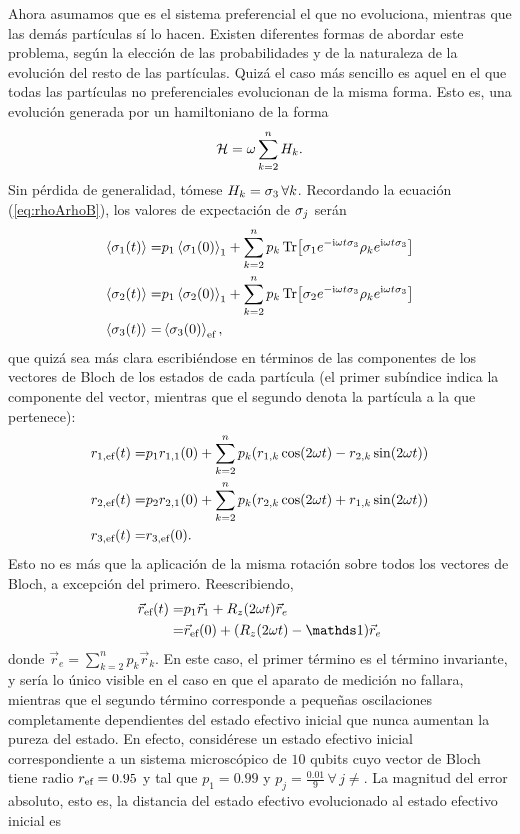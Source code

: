 Ahora asumamos que es el sistema preferencial el que no evoluciona, mientras que las demás partículas sí lo hacen. Existen diferentes formas de abordar este problema, según la elección de las probabilidades y de la naturaleza de la evolución del resto de las partículas. Quizá el caso más sencillo es aquel en el que todas las partículas no preferenciales evolucionan de la misma forma. Esto es, una evolución generada por un hamiltoniano de la forma
\begin{equation}
    \mathcal{H}=\omega \sum_{k=2}^{n}H_{k}.\nonumber
\end{equation}
Sin pérdida de generalidad, tómese $H_{k}=\sigma_{3}\,\forall k$. Recordando la ecuación (\ref{eq:rhoArhoB}), los valores de expectación de $\sigma_{j}$ serán
\begin{align}
    \expval{\sigma_{1}(t)}=&p_{1} \expval{\sigma_{1}(0)}_{1}+\sum_{k=2}^{n}p_{k}\Tr[\sigma_{1}e^{-\text{i}\omega t\sigma_{3}} \rho_{k} e^{\text{i}\omega t\sigma_{3}}]\nonumber\\
    \expval{\sigma_{2}(t)}=&p_{1} \expval{\sigma_{2}(0)}_{1}+\sum_{k=2}^{n}p_{k}\Tr[\sigma_{2}e^{-\text{i}\omega t\sigma_{3}} \rho_{k} e^{\text{i}\omega t\sigma_{3}}]\nonumber\\
    \expval{\sigma_{3}(t)}=&\expval{\sigma_{3}(0)}_{\text{ef}},\nonumber
\end{align}
que quizá sea más clara escribiéndose en términos de las componentes de los vectores de Bloch de los estados de cada partícula (el primer subíndice indica la componente del vector, mientras que el segundo denota la partícula a la que pertenece):
\begin{align}
    r_{1,\text{ef}}(t)=&p_{1}r_{1,1}(0)+\sum_{k=2}^{n}p_{k}(r_{1,k}\cos(2\omega t)-r_{2,k}\sin(2\omega t))\nonumber\\
    r_{2,\text{ef}}(t)=&p_{2}r_{2,1}(0)+\sum_{k=2}^{n}p_{k}(r_{2,k}\cos(2\omega t)+r_{1,k}\sin(2\omega t))\nonumber\\
    r_{3,\text{ef}}(t)=&r_{3,\text{ef}}(0).\nonumber
\end{align}
Esto no es más que la aplicación de la misma rotación sobre todos los vectores de Bloch, a excepción del primero. Reescribiendo,
\begin{align}
    \vec{r}_{\ef}(t)=&p_{1}\vec{r}_{1}+R_{z}(2\omega t)\vec{r}_{e}\nonumber\\
    =&\vec{r}_{\ef}(0)+(R_{z}(2\omega t)-\Id)\vec{r}_{e}\nonumber
\end{align}
donde $\vec{r}_{e}=\sum_{k=2}^{n}p_{k}\vec{r}_{k}$.
En este caso, el primer término es el término invariante, y sería lo único visible en el caso en que el aparato de medición no fallara, mientras que el segundo término corresponde a pequeñas oscilaciones completamente dependientes del estado efectivo inicial que nunca aumentan la pureza del estado. En efecto, considérese un estado efectivo inicial correspondiente a un sistema microscópico de $10$ qubits cuyo vector de Bloch tiene radio $r_{\text{ef}}=0.95$ y tal que $p_{1}=0.99$ y $p_{j}=\frac{0.01}{9}\,\forall\,j\neq $. La magnitud del error absoluto, esto es, la distancia del estado efectivo evolucionado al estado efectivo inicial es
